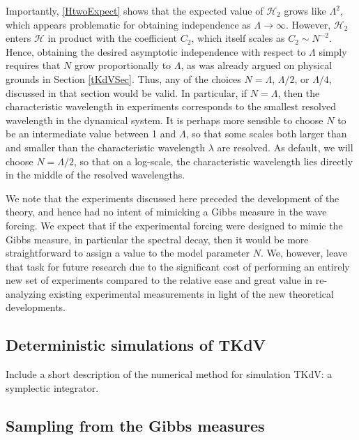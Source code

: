 \documentclass[11pt]{article}
\newcommand{\nick}[1]{{\color{red} #1}}
\newcommand{\lam}{\lambda}
\newcommand{\lamfac}{N}
\newcommand{\Ham}{\mathcal{H}}
\newcommand{\Htwo}{\Ham_{2}}
\begin{document}
	Importantly, \eqref{HtwoExpect} shows that the expected value of $\Htwo$ grows like $\Lambda^2$, which appears problematic for obtaining independence as $\Lambda \to \infty$. However, $\Htwo$ enters $\Ham$ in product with the coefficient $C_2$, which itself scales as $C_2 \sim \lamfac^{-2}$. Hence, obtaining the desired asymptotic independence with respect to $\Lambda$ simply requires that $\lamfac$ grow proportionally to $\Lambda$, as was already argued on physical grounds in Section \ref{tKdVSec}. 
Thus, any of the choices $\lamfac = \Lambda$, $\Lambda/2$, or $\Lambda/4$, discussed in that section would be valid. In particular, if $\lamfac = \Lambda$, then the characteristic wavelength in experiments corresponds to the smallest resolved wavelength in the dynamical system. It is perhaps more sensible to choose $\lamfac$ to be an intermediate value between 1 and $\Lambda$, so that some scales both larger than and smaller than the characteristic wavelength $\lam$ are resolved. As default, we will choose $\lamfac = \Lambda/2$, so that on a log-scale, the characteristic wavelength lies directly in the middle of the resolved wavelengths. 

	We note that the experiments discussed here preceded the development of the theory, and hence had no intent of mimicking a Gibbs measure in the wave forcing. We expect that if the experimental forcing were designed to mimic the Gibbs measure, in particular the spectral decay, then it would be more straightforward to assign a value to the model parameter $\lamfac$. We, however, leave that task for future research due to the significant cost of performing an entirely new set of experiments compared to the relative ease and great value in re-analyzing existing experimental measurements in light of the new theoretical developments.

\subsection{Deterministic simulations of TKdV}

\nick{Include a short description of the numerical method for simulation TKdV: a symplectic integrator.}

\subsection{Sampling from the Gibbs measures}
\end{document}
